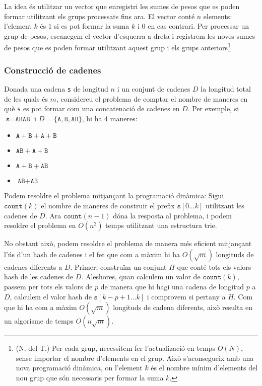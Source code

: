 La idea és utilitzar un vector que enregistri les sumes de pesos que
es poden formar utilitzant els grups processats fins ara. El vector
conté $n$ elements: l'element $k$ és 1 si es pot formar la suma $k$ i
0 en cas contrari. Per processar un grup de pesos, escanegem el vector
d'esquerra a dreta i registrem les noves sumes de pesos que es poden
formar utilitzant aquest grup i els grups anteriors\footnote{(N. del
T.) Per cada grup, necessitem fer l'actualizació en temps $O(N)$,
sense importar el nombre d'elements en el grup. Això s'aconsegueix amb
una nova programació dinàmica, on l'element $k$ és el nombre mínim
d'elements del nou grup que són necessaris per formar la suma $k$.}

\subsubsection{Construcció de cadenes}

Donada una cadena \texttt{s} de longitud $n$ i un conjunt de cadenes
$D$ la longitud total de les quals és $m$, considereu el problema de
comptar el nombre de maneres en què \texttt{s} es pot formar com una
concatenació de cadenes en $D$. Per exemple, si
$\texttt{s}=\texttt{ABAB}$ i
$D=\{\texttt{A},\texttt{B},\texttt{AB}\}$, hi ha 4 maneres:


\begin{itemize}[noitemsep]
\item $\texttt{A}+\texttt{B}+\texttt{A}+\texttt{B}$
\item $\texttt{AB}+\texttt{A}+\texttt{B}$
\item $\texttt{A}+\texttt{B}+\texttt{AB}$
\item $\texttt{AB}+\texttt{AB}$
\end{itemize}


Podem resoldre el problema mitjançant la programació dinàmica: Sigui
$\texttt{count}(k)$ el nombre de maneres de construir el
prefix $\texttt{s}[0 \ldots k]$ utilitzant les cadenes de $D$. Ara
$\texttt{count}(n-1)$ dóna la resposta al problema, i podem resoldre
el problema en $O(n^2)$ temps utilitzant una estructura trie.

No obstant això, podem resoldre el problema de manera més eficient
mitjançant l'ús d'un hash de cadenes i el fet que com a màxim hi ha
$O(\sqrt m)$ longituds de cadenes diferents a $D$. Primer, construïm
un conjunt $H$ que conté tots els valors hash de les cadenes de
$D$. Aleshores, quan calculem un valor de $\texttt{count}(k)$, passem
per tots els valors de $p$ de manera que hi hagi una cadena de
longitud $p$ a $D$, calculem el valor hash de
$\texttt{s}[k-p+1\ldots k]$ i comprovem si pertany a $H$. Com que hi ha
com a màxim $O(\sqrt m)$ longituds de cadena diferents, això resulta en un
algorisme de temps $O(n \sqrt m)$.

